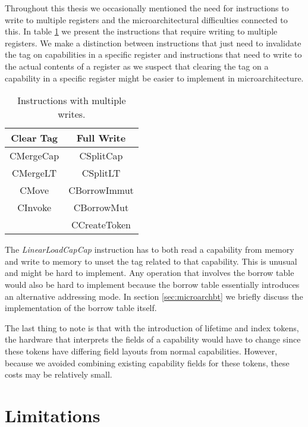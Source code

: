 Throughout this thesis we occasionally mentioned the need for instructions to write to multiple registers and the microarchitectural difficulties connected to this.
In table \ref{table:multiplewrites} we present the instructions that require writing to multiple registers.
We make a distinction between instructions that just need to invalidate the tag on capabilities in a specific register and instructions that need to write to the actual contents of a register as we suspect that clearing the tag on a capability in a specific register might be easier to implement in microarchitecture.

\begin{table}[h]
\centering
\begin{tabular}{| c | c |}
\hline
Clear Tag & Full Write \\
\hline
 CMergeCap & CSplitCap \\
 CMergeLT & CSplitLT \\
 CMove & CBorrowImmut \\
 CInvoke & CBorrowMut \\
 & CCreateToken \\
\hline
\end{tabular}
\caption{Instructions with multiple writes.}
\label{table:multiplewrites}
\end{table}

The \textit{LinearLoadCapCap} instruction has to both read a capability from memory and write to memory to unset the tag related to that capability.
This is unusual and might be hard to implement.
Any operation that involves the borrow table would also be hard to implement because the borrow table essentially introduces an alternative addressing mode.
In section \ref{sec:microarchbt} we briefly discuss the implementation of the borrow table itself.

The last thing to note is that with the introduction of lifetime and index tokens, the hardware that interprets the fields of a capability would have to change since these tokens have differing field layouts from normal capabilities.
However, because we avoided combining existing capability fields for these tokens, these costs may be relatively small.

\section{Limitations}
